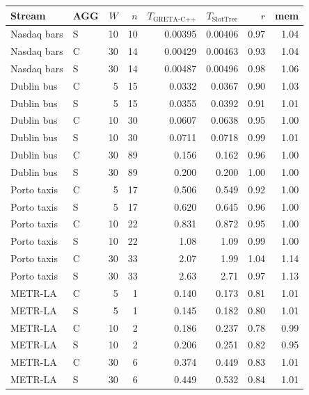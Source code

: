 {\begin{tabular}{@{}llrrrrrr@{}}\toprule
Stream & AGG & $W$ & $n$ & $T_{\textrm{GRETA-C++}}$ & $T_{\textrm{SlotTree}}$ & $r$ & mem \\\midrule
Nasdaq bars & S & 10 & 10 & 0.00395 & 0.00406 & 0.97 & 1.04 \\
Nasdaq bars & C & 30 & 14 & 0.00429 & 0.00463 & 0.93 & 1.04 \\
Nasdaq bars & S & 30 & 14 & 0.00487 & 0.00496 & 0.98 & 1.06 \\
\addlinespace[1pt]
Dublin bus & C & 5 & 15 & 0.0332 & 0.0367 & 0.90 & 1.03 \\
Dublin bus & S & 5 & 15 & 0.0355 & 0.0392 & 0.91 & 1.01 \\
Dublin bus & C & 10 & 30 & 0.0607 & 0.0638 & 0.95 & 1.00 \\
Dublin bus & S & 10 & 30 & 0.0711 & 0.0718 & 0.99 & 1.01 \\
Dublin bus & C & 30 & 89 & 0.156 & 0.162 & 0.96 & 1.00 \\
Dublin bus & S & 30 & 89 & 0.200 & 0.200 & 1.00 & 1.00 \\
\addlinespace[1pt]
Porto taxis & C & 5 & 17 & 0.506 & 0.549 & 0.92 & 1.00 \\
Porto taxis & S & 5 & 17 & 0.620 & 0.645 & 0.96 & 1.00 \\
Porto taxis & C & 10 & 22 & 0.831 & 0.872 & 0.95 & 1.00 \\
Porto taxis & S & 10 & 22 & 1.08 & 1.09 & 0.99 & 1.00 \\
Porto taxis & C & 30 & 33 & 2.07 & 1.99 & 1.04 & 1.14 \\
Porto taxis & S & 30 & 33 & 2.63 & 2.71 & 0.97 & 1.13 \\
\addlinespace[1pt]
METR-LA & C & 5 & 1 & 0.140 & 0.173 & 0.81 & 1.01 \\
METR-LA & S & 5 & 1 & 0.145 & 0.182 & 0.80 & 1.01 \\
METR-LA & C & 10 & 2 & 0.186 & 0.237 & 0.78 & 0.99 \\
METR-LA & S & 10 & 2 & 0.206 & 0.251 & 0.82 & 0.95 \\
METR-LA & C & 30 & 6 & 0.374 & 0.449 & 0.83 & 1.01 \\
METR-LA & S & 30 & 6 & 0.449 & 0.532 & 0.84 & 1.01 \\
\bottomrule\end{tabular}}
